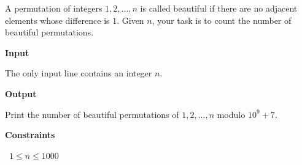 A permutation of integers $1,2,\ldots,n$ is called beautiful if there are no adjacent elements whose difference is $1$.
Given $n$, your task is to count the number of beautiful permutations.

\vspace{0.3cm}\noindent\textbf{Input}

The only input line contains an integer $n$.

\vspace{0.3cm}\noindent\textbf{Output}

Print the number of beautiful permutations of $1,2,\ldots,n$ modulo $10^9+7$.

\vspace{0.3cm}\noindent\textbf{Constraints}

\textbullet\ $1 \le n \le 1000$